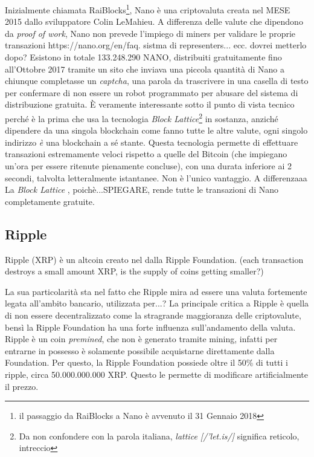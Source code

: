 \documentclass {article}
\begin{document}
Inizialmente chiamata RaiBlocks\footnote{il passaggio da RaiBlocks a Nano è avvenuto il 31 Gennaio 2018}, Nano è una criptovaluta creata nel MESE 2015 dallo sviluppatore Colin LeMahieu.
A differenza delle valute che dipendono da \textit{proof of work}, Nano non prevede l'impiego di miners per validare le proprie transazioni https://nano.org/en/faq.
sistma di representers... ecc. dovrei metterlo dopo?
Esistono in totale 133.248.290 NANO, distribuiti gratuitamente fino all'Ottobre 2017 tramite un sito che inviava una piccola quantità di Nano a chiunque completasse un \textit{captcha}, una parola da trascrivere in una casella di testo per confermare di non essere un robot programmato per abusare del sistema di distribuzione gratuita.
È veramente interessante sotto il punto di vista tecnico perché è la prima che usa la tecnologia \textit{Block Lattice}\footnote{Da non confondere con la parola italiana, \textit{lattice [/'let.is/]} significa reticolo, intreccio} in sostanza, anziché dipendere da una singola blockchain come fanno tutte le altre valute, ogni singolo indirizzo \emph{è} una blockchain a sé stante.
Questa tecnologia permette di effettuare transazioni estremamente veloci rispetto a quelle del Bitcoin (che impiegano un'ora per essere ritenute pienamente concluse), con una durata inferiore ai 2 secondi, talvolta letteralmente istantanee.
Non è l'unico vantaggio. A differenzaaa
La \textit{Block Lattice} , poichè...SPIEGARE, rende tutte le transazioni di Nano completamente gratuite.


\subsection {Ripple}


Ripple (XRP) è un altcoin creato nel dalla Ripple Foundation. (each transaction destroys a small amount XRP, is the supply of coins getting smaller?)

La sua particolarità sta nel fatto che Ripple mira ad essere una valuta fortemente legata all'ambito bancario, utilizzata per...?
La principale critica a Ripple è quella di non essere decentralizzato come la stragrande maggioranza delle criptovalute, bensì la Ripple Foundation ha una forte influenza sull'andamento della valuta.
Ripple è un coin \textit{premined}, che non è generato tramite mining, infatti per entrarne in possesso è solamente possibile acquistarne direttamente dalla Foundation.
Per questo, la Ripple Foundation possiede oltre il 50\% di tutti i ripple, circa 50.000.000.000 XRP. Questo le permette di modificare artificialmente il prezzo.
\end{document}
